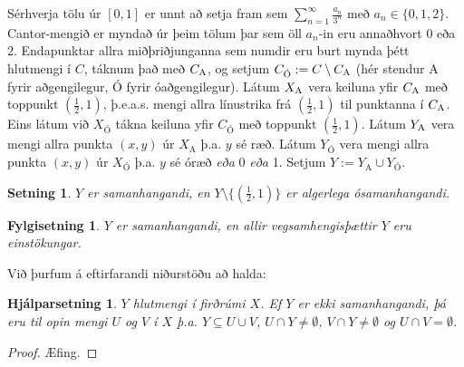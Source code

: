 \documentclass[a4paper,icelandic]{book}
\theoremstyle{definition}
\theoremstyle{plain}
\newtheorem{setn}{Setning}[section]
\newtheorem{fylgisetn}{Fylgisetning}[section]
\newtheorem{hjalparsetn}{Hjálparsetning}[section]
\theoremstyle{remark}
\begin{document}
Sérhverja tölu úr $\left[0,1\right]$ er unnt að setja fram sem
$\sum_{n=1}^\infty \frac{a_n}{3^n}$ með $a_n\in\{0,1,2\}$. Cantor-mengið er
myndað úr þeim tölum þar sem öll $a_n$-in eru annaðhvort $0$ eða
$2$. Endapunktar allra miðþriðjunganna sem numdir eru burt mynda þétt hlutmengi
í $C$, táknum það með $C_{\text A}$, og setjum $C_{\text{Ó}} := C\setminus
C_{\text A}$ (hér stendur A fyrir aðgengilegur, Ó fyrir óaðgengilegur). Látum
$X_{\text A}$ vera keiluna yfir $C_{\text A}$ með toppunkt $(\frac 12, 1)$,
þ.e.a.s. mengi allra línustrika frá $(\frac 12,1)$ til punktanna í $C_{\text
  A}$. Eins látum við $X_{\text{Ó}}$ tákna keiluna yfir $C_{\text{Ó}}$ með
toppunkt $(\frac 12, 1)$. Látum $Y_{\text A}$ vera mengi allra punkta $(x,y)$ úr
$X_\text{A}$ þ.a. $y$ sé ræð. Látum $Y_\text{Ó}$ vera mengi allra punkta $(x,y)$
úr $X_\text{Ó}$ þ.a. $y$ sé óræð \emph{eða} 0 \emph{eða} 1. Setjum $Y :=
Y_\text{A} \cup Y_\text{Ó}$.
\begin{setn}\label{setn:polska_martrod}
  $Y$ er samanhangandi, en $Y\setminus\{(\frac 12, 1)\}$ er algerlega
  ósamanhangandi. 
\end{setn}
\begin{fylgisetn}
  $Y$ er samanhangandi, en allir vegsamhengisþættir $Y$ eru einstökungar.
\end{fylgisetn}
Við þurfum á eftirfarandi niðurstöðu að halda:
\begin{hjalparsetn}
  $Y$ hlutmengi í firðrúmi $X$. Ef $Y$ er \emph{ekki} samanhangandi, þá eru til
  opin mengi $U$ og $V$ í $X$ þ.a. $Y\subseteq U\cup V$, $U\cap Y\neq\emptyset$,
  $V\cap Y\neq\emptyset$ og $U\cap V=\emptyset$.
\end{hjalparsetn}
\begin{proof}
  Æfing.
\end{proof}
\end{document}
